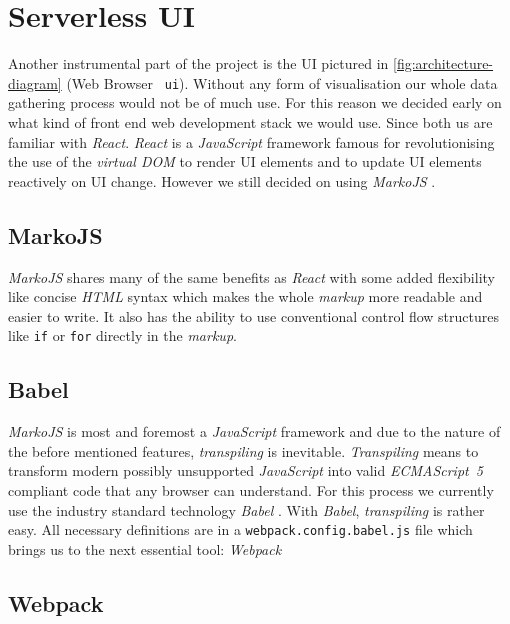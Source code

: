 \section{Serverless UI}

Another instrumental part of the project is the UI pictured in \autoref{fig:architecture-diagram}
(Web Browser \textrightarrow\ \texttt{ui}). Without any form of visualisation our whole data
gathering process would not be of much use. For this reason we decided early on what kind of front
end web development stack we would use. Since both us are familiar with \textit{React}.
\textit{React} is a \textit{JavaScript} framework famous for revolutionising the use of the
\textit{virtual DOM} to render UI elements and to update UI elements reactively on
UI change. However we still decided on using \textit{MarkoJS} \cite{marko}.

\subsection{MarkoJS}

\textit{MarkoJS} shares many of the same benefits as \textit{React} with some added flexibility like
concise \textit{HTML} syntax which makes the whole \textit{markup} more readable and easier to
write. It also has the ability to use conventional control flow structures like \texttt{if} or
\texttt{for} directly in the \textit{markup}.

\subsection{Babel}

\textit{MarkoJS} is most and foremost a \textit{JavaScript} framework and due to the nature of the
before mentioned features, \textit{transpiling} is inevitable. \textit{Transpiling} means to
transform modern possibly unsupported \textit{JavaScript} into valid \textit{ECMAScript~5} compliant
code that any browser can understand. For this process we currently use the industry standard
technology \textit{Babel} \cite{babel}. With \textit{Babel}, \textit{transpiling} is rather easy. All
necessary definitions are in a \texttt{webpack.config.babel.js} file which brings us to the next
essential tool: \textit{Webpack}

\subsection{Webpack}
\label{sec:webpack}

